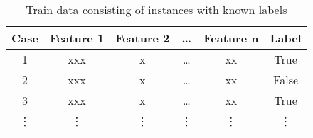 \begin{table}[h!]
    \small
    \centering
    \begin{tabular}{@{}cccccc@{}}
        \toprule
        \textbf{Case} & \textbf{Feature 1} & \textbf{Feature 2} & \dots  & \textbf{Feature n} & \textbf{Label} \\
        \midrule
        1             & xxx                & x                  & \dots  & xx                 & True           \\
        2             & xxx                & x                  & \dots  & xx                 & False          \\
        3             & xxx                & x                  & \dots  & xx                 & True           \\
        \vdots        & \vdots             & \vdots             & \vdots & \vdots             & \vdots         \\
        \bottomrule
    \end{tabular}
    \caption[Train data consisting of instances with known labels]{Train data consisting of instances with known labels \footnotemark}
    \label{tab:classifier_label_data}
\end{table}
